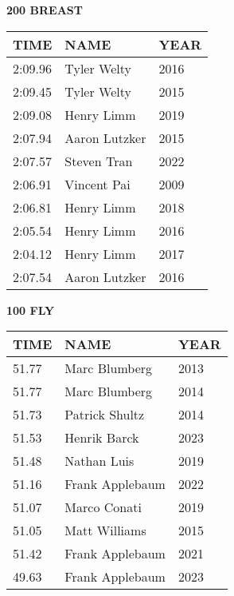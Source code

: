 \begin{minipage}[t]{0.48\textwidth}
\centering
\textbf{200 BREAST}\\[0.05cm]
\begin{tabular}{@{}p{1.8cm}p{2.8cm}p{1.2cm}@{}}
\hline
\textbf{TIME} & \textbf{NAME} & \textbf{YEAR} \\
\hline
2:09.96 & Tyler Welty & 2016 \\
2:09.45 & Tyler Welty & 2015 \\
2:09.08 & Henry Limm & 2019 \\
2:07.94 & Aaron Lutzker & 2015 \\
2:07.57 & Steven Tran & 2022 \\
2:06.91 & Vincent Pai & 2009 \\
2:06.81 & Henry Limm & 2018 \\
2:05.54 & Henry Limm & 2016 \\
2:04.12 & Henry Limm & 2017 \\
2:07.54 & Aaron Lutzker & 2016 \\
\hline
\end{tabular}
\end{minipage}\hfill
\begin{minipage}[t]{0.48\textwidth}
\centering
\textbf{100 FLY}\\[0.05cm]
\begin{tabular}{@{}p{1.8cm}p{2.8cm}p{1.2cm}@{}}
\hline
\textbf{TIME} & \textbf{NAME} & \textbf{YEAR} \\
\hline
51.77 & Marc Blumberg & 2013 \\
51.77 & Marc Blumberg & 2014 \\
51.73 & Patrick Shultz & 2014 \\
51.53 & Henrik Barck & 2023 \\
51.48 & Nathan Luis & 2019 \\
51.16 & Frank Applebaum & 2022 \\
51.07 & Marco Conati & 2019 \\
51.05 & Matt Williams & 2015 \\
51.42 & Frank Applebaum & 2021 \\
49.63 & Frank Applebaum & 2023 \\
\hline
\end{tabular}
\end{minipage}

\vspace{0.4cm}

